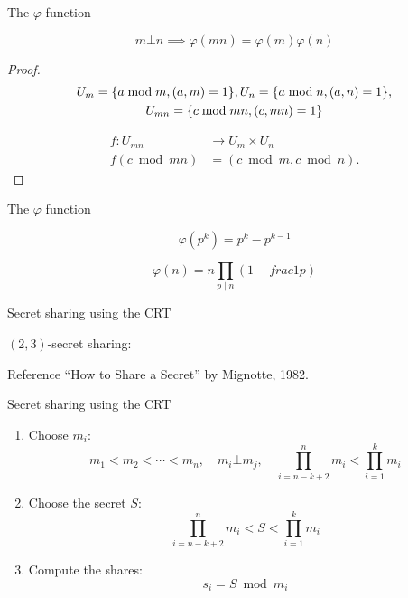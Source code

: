 \begin{frame}{The $\varphi$ function}
  \begin{theorem}
	\[
	  m \bot n \implies \varphi(mn) = \varphi(m) \varphi(n)
	\]
  \end{theorem}

  \begin{proof}
	\begin{gather*}
	  U_{m} = \{a \bmod m, (a,m) = 1\}, U_{n} = \{a \bmod n, (a,n) = 1\}, \\
	  U_{mn} = \{c \bmod mn, (c, mn) = 1\}
	\end{gather*}

	\begin{align*}
	  f: U_{mn} &\to U_m \times U_n \\
	  f(c \bmod mn) &= (c \bmod m, c \bmod n).
	\end{align*}
  \end{proof}
\end{frame}
\begin{frame}{The $\varphi$ function}
  \begin{theorem}
	\[
	  \varphi(p^k) = p^k - p^{k-1}
	\]

	\[
	  \varphi(n) = n \prod_{p \mid n} (1 - frac{1}{p})
	\]
  \end{theorem}
\end{frame}
\begin{frame}{Secret sharing using the CRT}
  \begin{definition}
	$(2,3)$-secret sharing:
  \end{definition}

  \pause
  \begin{alertblock}{Reference}
	``How to Share a Secret'' by Mignotte, 1982.
  \end{alertblock}
\end{frame}
\begin{frame}{Secret sharing using the CRT}
  \begin{enumerate}[<+->]
	\item Choose $m_i$:
	  \[
		m_1 < m_2 < \cdots < m_n, \quad m_i \bot m_j, \quad \prod_{i=n-k+2}^{n} m_i < \prod_{i=1}^{k} m_i
	  \]
	\item Choose the secret $S$:
	  \[
		\prod_{i=n-k+2}^{n} m_i < S < \prod_{i=1}^{k} m_i
	  \]
	\item Compute the shares:
	  \[
		s_i = S \bmod m_i
	  \]
  \end{enumerate}
\end{frame}
